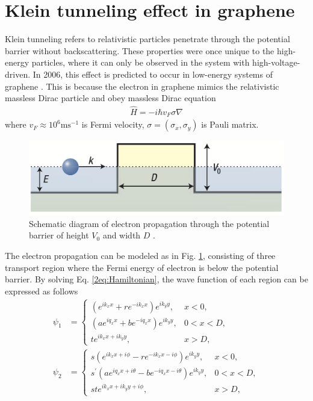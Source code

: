 \section{Klein tunneling effect in graphene} \label{2sec:klein effect}
    Klein tunneling refers to relativistic particles penetrate through the potential barrier without backscattering.
    These properties were once unique to the high-energy particles, where it can only be observed in the system with high-voltage-driven.
    In 2006, this effect is predicted to occur in low-energy systems of graphene \cite{Katsnelson2006a}.
    This is because the electron in graphene mimics the relativistic massless Dirac particle and obey massless Dirac equation
    \begin{align} \label{2eq:Hamiltonian}
        \hat{H} = -i\hbar v_F \sigma \nabla 
    \end{align}
    where $v_F \approx 10^6 \mathrm{ms^{-1}}$ is Fermi velocity, $\sigma = (\sigma_x, \sigma_y)$ is Pauli matrix. 
    \begin{figure}[H]
        \centering
        \includegraphics[width=0.7\linewidth]{fig/Chap 2/electron propagation.png}
        \caption{Schematic diagram of electron propagation through the potential barrier of height $V_0$ and width $D$ \cite{Katsnelson2006a}.}
        \label{2fig:electron propagation}
    \end{figure}
    The electron propagation can be modeled as in Fig. \ref{2fig:electron propagation}, consisting of three transport region where the Fermi energy of electron is below the potential barrier.
    By solving Eq. \ref{2eq:Hamiltonian}, the wave function of each region can be expressed as follows
    \begin{equation} \label{2eq:wave function}
        \begin{aligned}
            \psi_1 &= \begin{cases} (e^{ik_x x}+re^{-ik_x x})e^{ik_y y}, &x<0,\\
                (ae^{i q_x x}+be^{-i q_x x})e^{ik_y y},  &0<x<D,\\
                te^{ik_x x + ik_y y},  &x>D,
                \end{cases}\\
            \psi_2 &= \begin{cases} s(e^{ik_x x+i \phi}-re^{-ik_x x-i \phi})e^{ik_y y},  &x<0,\\
                s^\prime(ae^{i q_x x+ i \theta}-be^{-i q_x x- i \theta})e^{ik_y y}, &0<x<D,\\
                ste^{ik_x x + ik_y y+ i \phi}, &x>D,
                \end{cases}
        \end{aligned}
    \end{equation}
